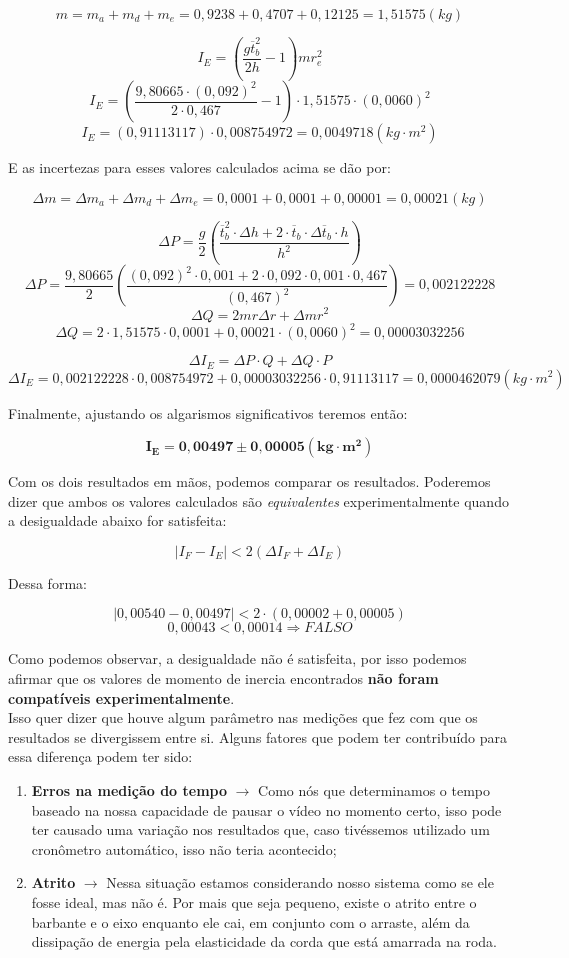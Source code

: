 \[m = m_a + m_d + m_e = 0,9238 + 0,4707 + 0,12125 = 1,51575 (kg)\]

\[I_E = \left( \frac{g \overline{t}_b^2}{2h} - 1 \right) m r_e^2\]
\[I_E = \left( \frac{9,80665 \cdot (0,092)^2}{2 \cdot 0,467} - 1 \right) \cdot 1,51575 \cdot (0,0060)^2\]
\[I_E = \left(0,91113117 \right) \cdot 0,008754972 = 0,0049718 (kg \cdot m^2)\]

E as incertezas para esses valores calculados acima se dão por:

\[\Delta m = \Delta m_a + \Delta m_d + \Delta m_e = 0,0001 + 0,0001 + 0,00001 = 0,00021 (kg)\]

\[
    \Delta P = \frac{g}{2} 
    \left( 
        \frac
        {\overline{t}_b^2 \cdot \Delta h + 2 \cdot \overline{t}_b \cdot \Delta \overline{t}_b \cdot h}
        {h^2} 
    \right)
\]
\[
    \Delta P = \frac{9,80665}{2} \left(\frac{(0,092)^2 \cdot 0,001 + 2 \cdot 0,092 \cdot 0,001 \cdot 0,467}{(0,467)^2} \right) = 0,002122228
\]
\[\Delta Q = 2mr \Delta r + \Delta m r^2\]
\[\Delta Q = 2 \cdot 1,51575 \cdot 0,0001 + 0,00021 \cdot (0,0060)^2 = 0,00003032256\]

\[\Delta I_E = \Delta P \cdot Q + \Delta Q \cdot P\]
\[\Delta I_E = 0,002122228 \cdot 0,008754972 + 0,00003032256 \cdot 0,91113117 = 0,0000462079 (kg \cdot m^2)\]

Finalmente, ajustando os algarismos significativos teremos então:

\[\mathbf{I_E = 0,00497 \pm 0,00005 (kg \cdot m^2)}\]

Com os dois resultados em mãos, podemos comparar os resultados. Poderemos dizer que ambos os valores calculados são \textit{equivalentes} experimentalmente quando a desigualdade abaixo for satisfeita:

\[| I_F - I_E | < 2 (\Delta I_F + \Delta I_E)\]

Dessa forma:

\[| 0,00540 - 0,00497 | < 2 \cdot (0,00002 + 0,00005)\]
\[0,00043 < 0,00014 \Rightarrow FALSO\]

Como podemos observar, a desigualdade não é satisfeita, por isso podemos afirmar que os valores de momento de inercia encontrados \textbf{não foram compatíveis experimentalmente}. \\

Isso quer dizer que houve algum parâmetro nas medições que fez com que os resultados se divergissem entre si. Alguns fatores que podem ter contribuído para essa diferença podem ter sido:

\begin{enumerate}
    \item \textbf{Erros na medição do tempo} $\xrightarrow{}$ Como nós que determinamos o tempo baseado na nossa capacidade de pausar o vídeo no momento certo, isso pode ter causado uma variação nos resultados que, caso tivéssemos utilizado um cronômetro automático, isso não teria acontecido;
    \item \textbf{Atrito} $\xrightarrow{}$ Nessa situação estamos considerando nosso sistema como se ele fosse ideal, mas não é. Por mais que seja pequeno, existe o atrito entre o barbante e o eixo enquanto ele cai, em conjunto com o arraste, além da dissipação de energia pela elasticidade da corda que está amarrada na roda.
\end{enumerate}
